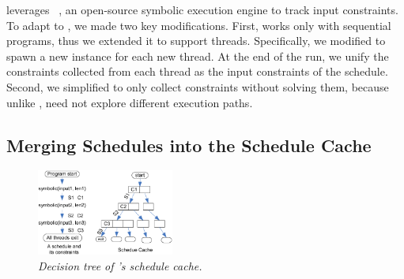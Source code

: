 \tern leverages \klee~\cite{klee:osdi08}, an open-source symbolic execution
engine to track input constraints.  To adapt \klee to \tern, we made two key
modifications.  First, \klee works only with sequential programs, thus we
extended it to support threads.  Specifically, we modified \klee to spawn a
new \klee instance for each new thread.  At the end of the run, we unify
the constraints collected from each thread as the input constraints of the
schedule.  Second, we simplified \klee to only collect constraints without
solving them, because unlike \klee, \tern need not explore different
execution paths.





\subsection{Merging Schedules into the Schedule Cache} \label{sec:tern-schedule-cache}

\begin{figure}[t]
\begin{center}
\includegraphics[width=0.4\textwidth]{tern/figures/cache.eps}
\end{center}
\caption{\emph{Decision tree of \tern's schedule cache.}}
\label{fig:tern-schedule-tree}
\end{figure}

